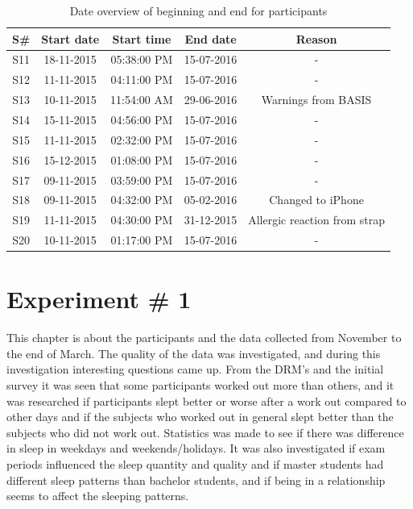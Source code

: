 \documentclass[12pt]{article} %
\begin{document}
\begin{table}[H]
\center
\begin{footnotesize}
	\begin{tabular}{| c | c | c | c | c |}
	\hline
	\textbf{S\#} & \textbf{Start date} & \textbf{Start time} & \textbf{End date} & \textbf{Reason} \\
	
	\hline
	S11 & 18-11-2015 & 05:38:00 PM & 15-07-2016 & -\\
	S12 & 11-11-2015 & 04:11:00 PM & 15-07-2016 & -\\
	S13 & 10-11-2015 & 11:54:00 AM & 29-06-2016 & Warnings from BASIS\\
	S14 & 15-11-2015 & 04:56:00 PM & 15-07-2016 & -\\
	S15 & 11-11-2015 & 02:32:00 PM & 15-07-2016 & -\\
	S16 & 15-12-2015 & 01:08:00 PM & 15-07-2016 & -\\
	S17 & 09-11-2015 & 03:59:00 PM & 15-07-2016 & -\\
	S18 & 09-11-2015 & 04:32:00 PM & 05-02-2016 & Changed to iPhone\\
	S19 & 11-11-2015 & 04:30:00 PM & 31-12-2015 & Allergic reaction from strap\\
	S20 & 10-11-2015 & 01:17:00 PM & 15-07-2016 & -\\
	\hline
	\end{tabular}
	\caption{Date overview of beginning and end for participants}
	\label{tab:beginning}
\end{footnotesize}
\end{table}




\newpage	
\section{Experiment \# 1}
\label{sec:experiment1}
This chapter is about the participants and the data collected from November to the end of March. The quality of the data was investigated, and during this investigation interesting questions came up. From the DRM's and the initial survey it was seen that some participants worked out more than others, and it was researched if participants slept better or worse after a work out compared to other days and if the subjects who worked out in general slept better than the subjects who did not work out. Statistics was made to see if there was difference in sleep in weekdays and weekends/holidays. It was also investigated if exam periods influenced the sleep quantity and quality and if master students had different sleep patterns than bachelor students, and if being in a relationship seems to affect the sleeping patterns. \\
\end{document}
